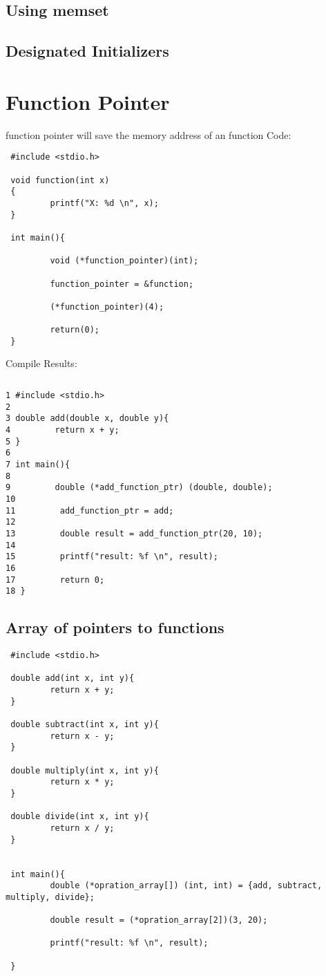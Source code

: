 \subsection{Using memset}
\subsection{Designated Initializers}

\section{Function Pointer}
function pointer will save the memory address of an function
Code:
\begin{lstlisting} 
 #include <stdio.h>

 void function(int x)
 {
         printf("X: %d \n", x);
 }

 int main(){

         void (*function_pointer)(int);

         function_pointer = &function;

         (*function_pointer)(4);

         return(0);
 }
\end{lstlisting}

Compile Results:
\begin{lstlisting} 

\end{lstlisting}


\begin{lstlisting} 
1 #include <stdio.h>
2
3 double add(double x, double y){
4         return x + y;
5 }
6
7 int main(){
8
9         double (*add_function_ptr) (double, double);
10
11         add_function_ptr = add;
12
13         double result = add_function_ptr(20, 10);
14
15         printf("result: %f \n", result);
16
17         return 0;
18 }
\end{lstlisting}

\subsection{Array of pointers to functions}

\begin{lstlisting} 
 #include <stdio.h>

 double add(int x, int y){
         return x + y;
 }

 double subtract(int x, int y){
         return x - y;
 }

 double multiply(int x, int y){
         return x * y;
 }

 double divide(int x, int y){
         return x / y;
 }


 int main(){
         double (*opration_array[]) (int, int) = {add, subtract, multiply, divide};

         double result = (*opration_array[2])(3, 20);

         printf("result: %f \n", result);

 }
\end{lstlisting}

